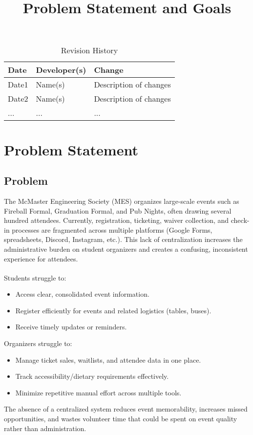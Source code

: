 \documentclass{article}
\title{Problem Statement and Goals\\\progname}
\author{\authname}
\date{}
\begin{document}
\sloppy

\maketitle

\begin{table}[hp]
\caption{Revision History} \label{TblRevisionHistory}
\begin{tabularx}{\textwidth}{llX}
\toprule
\textbf{Date} & \textbf{Developer(s)} & \textbf{Change}\\
\midrule
Date1 & Name(s) & Description of changes\\
Date2 & Name(s) & Description of changes\\
... & ... & ...\\
\bottomrule
\end{tabularx}
\end{table}

\section{Problem Statement}

\subsection{Problem}
The McMaster Engineering Society (MES) organizes large-scale events such as Fireball Formal, Graduation Formal,
 and Pub Nights, often drawing several hundred attendees. Currently, registration, ticketing, waiver collection,
 and check-in processes are fragmented across multiple platforms (Google Forms, spreadsheets, Discord, Instagram,
 etc.). This lack of centralization increases the administrative burden on student organizers and creates a
 confusing, inconsistent experience for attendees.
\\
\\Students struggle to:
\begin{itemize}
    \item Access clear, consolidated event information.
    \item Register efficiently for events and related logistics (tables, buses).
    \item Receive timely updates or reminders.
\end{itemize}
Organizers struggle to:
\begin{itemize}
    \item Manage ticket sales, waitlists, and attendee data in one place.
    \item Track accessibility/dietary requirements effectively.
    \item Minimize repetitive manual effort across multiple tools.
\end{itemize}
The absence of a centralized system reduces event memorability, increases missed opportunities, and 
wastes volunteer time that could be spent on event quality rather than administration.
\end{document}
